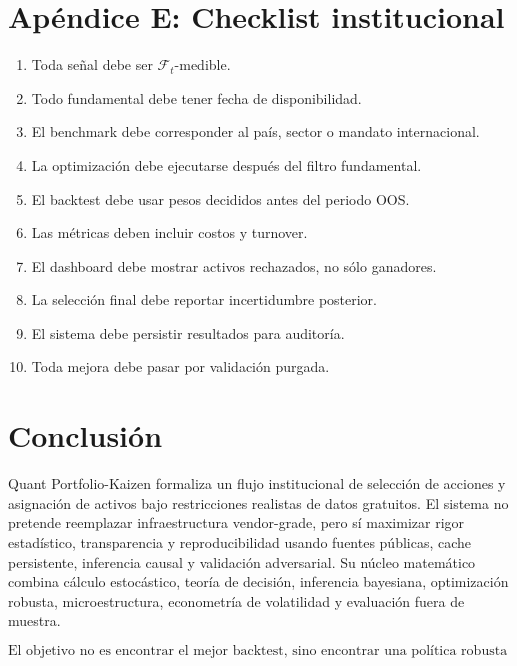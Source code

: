 \documentclass[11pt,letterpaper]{article}
\newcommand{\F}{\mathcal{F}}
\newcommand{\1}{\mathbf{1}}
\begin{document}
\section{Apéndice E: Checklist institucional}

\begin{enumerate}
    \item Toda señal debe ser \(\F_t\)-medible.
    \item Todo fundamental debe tener fecha de disponibilidad.
    \item El benchmark debe corresponder al país, sector o mandato internacional.
    \item La optimización debe ejecutarse después del filtro fundamental.
    \item El backtest debe usar pesos decididos antes del periodo OOS.
    \item Las métricas deben incluir costos y turnover.
    \item El dashboard debe mostrar activos rechazados, no sólo ganadores.
    \item La selección final debe reportar incertidumbre posterior.
    \item El sistema debe persistir resultados para auditoría.
    \item Toda mejora debe pasar por validación purgada.
\end{enumerate}

\section{Conclusión}

Quant Portfolio-Kaizen formaliza un flujo institucional de selección de acciones y asignación de activos bajo restricciones realistas de datos gratuitos. El sistema no pretende reemplazar infraestructura vendor-grade, pero sí maximizar rigor estadístico, transparencia y reproducibilidad usando fuentes públicas, cache persistente, inferencia causal y validación adversarial. Su núcleo matemático combina cálculo estocástico, teoría de decisión, inferencia bayesiana, optimización robusta, microestructura, econometría de volatilidad y evaluación fuera de muestra.

\[
    \boxed{
    \text{El objetivo no es encontrar el mejor backtest, sino encontrar una política robusta que sobreviva al siguiente régimen.}
    }
\]
\end{document}
